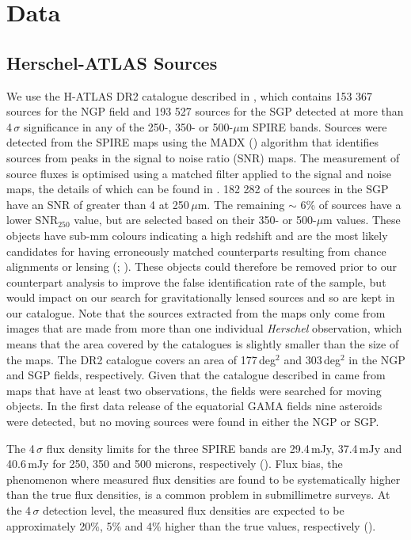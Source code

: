 \documentclass[fleqn,usenatbib]{mnras}
\begin{document}
\section{Data}
\label{sec:data}
\subsection{Herschel-ATLAS Sources}
\label{sec:h-atlas_sources}

We use the H-ATLAS DR2 catalogue described in \citealt{Maddox_2018}, which contains 153 367 sources for the NGP field and 193 527 sources for the SGP detected at more than 4\,$\sigma$ significance in any of the 250-, 350- or 500-$\mu$m SPIRE bands. Sources were detected from the SPIRE maps using the MADX (\citealt{Maddox_2020}) algorithm that identifies sources from peaks in the signal to noise ratio (SNR) maps. The measurement of source fluxes is optimised using a matched filter applied to the signal and noise maps, the details of which can be found in \citealt{Valiante_2016}. 182 282 of the sources in the SGP have an SNR of greater than 4 at 250\,$\mu$m. The remaining $\sim$ 6\% of sources have a lower $\textrm{SNR}_{250}$ value, but are selected based on their 350- or 500-$\mu$m values. These objects have sub-mm colours indicating a high redshift and are the most likely candidates for having erroneously matched counterparts resulting from chance alignments or lensing (\citealt{Negrello_2010}; \citealt{Bourne_2014}). These objects could therefore be removed prior to our counterpart analysis to improve the false identification rate of the sample, but would impact on our search for gravitationally lensed sources and so are kept in our catalogue. Note that the sources extracted from the maps only come from images that are made from more than one individual \textit{Herschel} observation, which means that the area covered by the catalogues is slightly smaller than the size of the maps. The DR2 catalogue covers an area of 177\,deg$^2$ and 303\,deg$^2$ in the NGP and SGP fields, respectively. Given that the catalogue described in \citealt{Maddox_2018} came from maps that have at least two observations, the fields were searched for moving objects. In the first data release of the equatorial GAMA fields nine asteroids were detected, but no moving sources were found in either the NGP or SGP.

The 4\,$\sigma$ flux density limits for the three SPIRE bands are 29.4\,mJy, 37.4\,mJy and 40.6\,mJy for 250, 350 and 500 microns, respectively (\citealt{Valiante_2016}). Flux bias, the phenomenon where measured flux densities are found to be systematically higher than the true flux densities, is a common problem in submillimetre surveys. At the 4\,$\sigma$ detection level, the measured flux densities are expected to be approximately 20\%, 5\% and 4\% higher than the true values, respectively (\citealt{Maddox_2018}).
\end{document}

